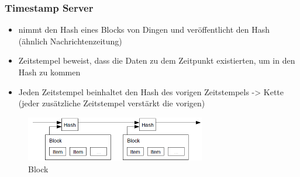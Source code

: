 \subsubsection*{Timestamp Server}
    \begin{itemize}
        \item nimmt den Hash eines Blocks von Dingen und veröffentlicht den Hash (ähnlich Nachrichtenzeitung)
        \item Zeitstempel beweist, dass die Daten zu dem Zeitpunkt existierten, um in den Hash zu kommen
        \item Jeden Zeitstempel beinhaltet den Hash des vorigen Zeitstempels -> Kette (jeder zusätzliche Zeitstempel verstärkt die vorigen)
    \end{itemize}
    \begin{figure}[H]
        \centering
        \includegraphics[width=0.7\textwidth]{paperNotes/bitcoin02.PNG}
        \caption{Block}
        \label{figure:block}
    \end{figure}

